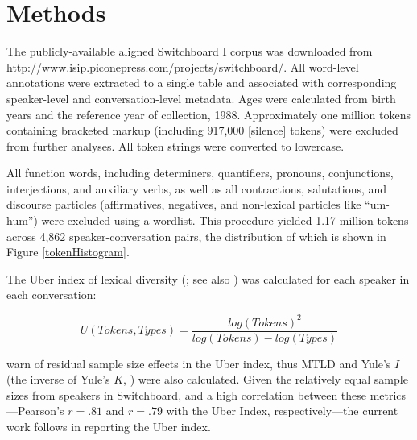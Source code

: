 \documentclass[10pt,letterpaper]{article}
\begin{document}
\section{Methods}
The publicly-available aligned Switchboard I corpus was downloaded from \url{http://www.isip.piconepress.com/projects/switchboard/}. All word-level annotations were extracted to a single table and associated with corresponding speaker-level and conversation-level metadata. Ages were calculated from birth years and the reference year of collection, 1988. Approximately one million tokens containing bracketed markup (including 917,000  [silence] tokens) were excluded from further analyses. All token strings were converted to lowercase.

All function words, including determiners, quantifiers, pronouns, conjunctions, interjections, and auxiliary verbs, as well as all contractions, salutations, and discourse particles (affirmatives, negatives, and non-lexical particles like ``um-hum'') were excluded using a wordlist. This procedure yielded 1.17 million tokens across 4,862 speaker-conversation pairs, the distribution of which is shown in Figure \ref{tokenHistogram}.


The Uber index of lexical diversity (\citealp{dugast1980}; see also \citealp{jarvis2002}) was calculated for each speaker in each conversation: 

\begin{equation}
\label{eq:Uber} 
U(Tokens,Types) = \frac{log(Tokens)^2 }{log(Tokens) - log(Types)}
\end{equation}

\noindent \citet{tweedieBaayen1998} warn of residual sample size effects in the Uber index, thus MTLD \citep{mccarthy2010} and Yule's $I$ (the inverse of Yule's $K$, \citealt{yule1944}) were also calculated.  Given the relatively equal sample sizes from speakers in Switchboard, and a high correlation between these metrics---Pearson's $r = .81$ and $r=.79$ with the Uber Index, respectively---the current work follows \citet{hortonEtAl2010} in reporting the Uber index. 
\end{document}
